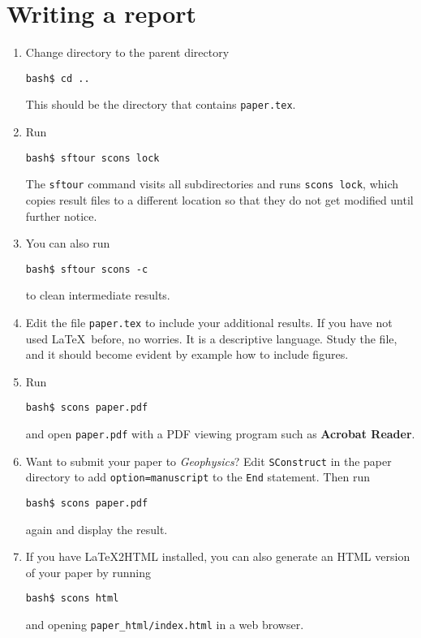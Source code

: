 \lstset{language=python,numbers=left,numberstyle=\tiny,showstringspaces=false}




\lstset{language=python,numbers=left,numberstyle=\tiny,showstringspaces=false}


\section{Writing a report}

\begin{enumerate}
\item Change directory to the parent directory
\begin{verbatim}
bash$ cd ..
\end{verbatim}
This should be the directory that contains \texttt{paper.tex}.
\item Run
\begin{verbatim}
bash$ sftour scons lock
\end{verbatim}
The \texttt{sftour} command visits all subdirectories and runs \texttt{scons lock}, which copies result files to a different location so that they do not get modified until further notice.
\item You can also run
\begin{verbatim}
bash$ sftour scons -c
\end{verbatim}
to clean intermediate results.
\item Edit the file \texttt{paper.tex} to include your additional results. If you have not used \LaTeX\ before, no worries. It is a descriptive language. Study the file, and it should become evident by example how to include figures.
\item Run
\begin{verbatim}
bash$ scons paper.pdf
\end{verbatim}
and open \texttt{paper.pdf} with a PDF viewing program such as \textbf{Acrobat Reader}. 
\item Want to submit your paper to \emph{Geophysics}? Edit \texttt{SConstruct} in the 
paper directory to add \texttt{option=manuscript} to the \texttt{End} statement. Then run
\begin{verbatim}
bash$ scons paper.pdf
\end{verbatim}
again and display the result.
\item If you have \LaTeX2HTML installed, you can also generate an HTML version of your paper by running
\begin{verbatim}
bash$ scons html
\end{verbatim}
and opening \verb#paper_html/index.html# in a web browser.
\end{enumerate}

%






